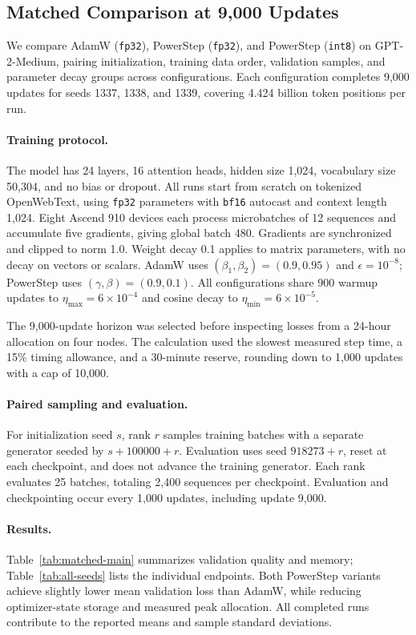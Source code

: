 \documentclass{article}
\begin{document}
\subsection{Matched Comparison at 9,000 Updates}\label{app:matched}\label{sec:matched-validation}\label{sec:matched}
We compare AdamW (\texttt{fp32}), PowerStep (\texttt{fp32}), and PowerStep (\texttt{int8}) on GPT-2-Medium, pairing initialization, training data order, validation samples, and parameter decay groups across configurations. Each configuration completes 9,000 updates for seeds 1337, 1338, and 1339, covering 4.424 billion token positions per run.

\paragraph{Training protocol.}
The model has 24 layers, 16 attention heads, hidden size 1,024, vocabulary size 50,304, and no bias or dropout. All runs start from scratch on tokenized OpenWebText, using \texttt{fp32} parameters with \texttt{bf16} autocast and context length 1,024. Eight Ascend 910 devices each process microbatches of 12 sequences and accumulate five gradients, giving global batch 480. Gradients are synchronized and clipped to norm 1.0. Weight decay 0.1 applies to matrix parameters, with no decay on vectors or scalars. AdamW uses $(\beta_1,\beta_2)=(0.9,0.95)$ and $\epsilon=10^{-8}$; PowerStep uses $(\gamma,\beta)=(0.9,0.1)$. All configurations share 900 warmup updates to $\eta_{\max}=6\times10^{-4}$ and cosine decay to $\eta_{\min}=6\times10^{-5}$.

The 9,000-update horizon was selected before inspecting losses from a 24-hour allocation on four nodes. The calculation used the slowest measured step time, a 15\% timing allowance, and a 30-minute reserve, rounding down to 1,000 updates with a cap of 10,000.

\paragraph{Paired sampling and evaluation.}
For initialization seed $s$, rank $r$ samples training batches with a separate generator seeded by $s+100000+r$. Evaluation uses seed $918273+r$, reset at each checkpoint, and does not advance the training generator. Each rank evaluates 25 batches, totaling 2,400 sequences per checkpoint. Evaluation and checkpointing occur every 1,000 updates, including update 9,000.

\paragraph{Results.}
Table~\ref{tab:matched-main} summarizes validation quality and memory; Table~\ref{tab:all-seeds} lists the individual endpoints. Both PowerStep variants achieve slightly lower mean validation loss than AdamW, while reducing optimizer-state storage and measured peak allocation. All completed runs contribute to the reported means and sample standard deviations.
\end{document}

